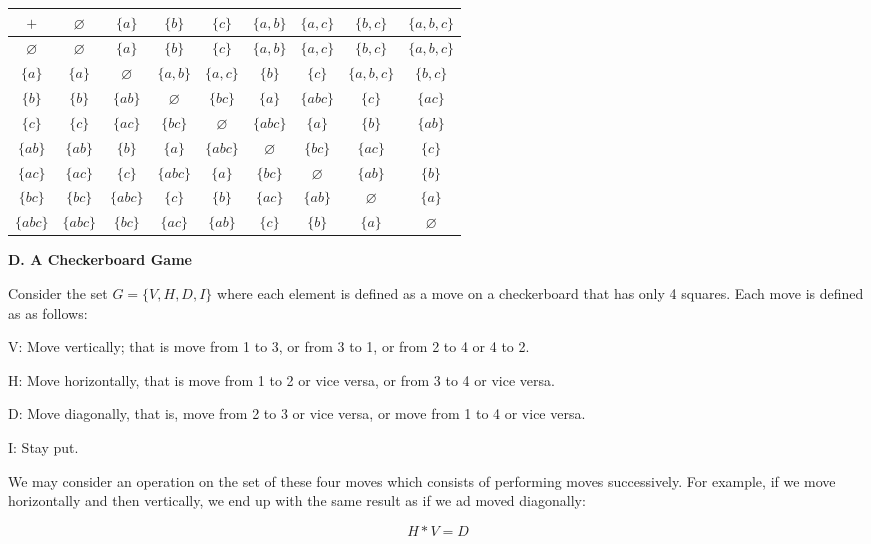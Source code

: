 \documentclass[12pt]{article}   %
\let\emptyset\varnothing
\begin{document}
\begin{tabular}{c | c c c c c c c c}
$+$ & $\emptyset$ & $\{a\}$ & $\{b\}$ & $\{c\}$ & $\{a,b\}$ & $\{a,c\}$ & $\{b,c\}$ & $\{a,b,c\}$ \\
\hline
$\emptyset$ & $\emptyset$ & $\{a\}$ & $\{b\}$ & $\{c\}$ & $\{a,b\}$ & $\{a,c\}$ & $\{b,c\}$ & $\{a,b,c\}$ \\
$\{a\}$ & $\{a\}$ & $\emptyset$ & $\{a,b\}$ & $\{a,c\}$ & $\{b\}$ & $\{c\}$ & $\{a,b,c\}$ & $\{b,c\}$ \\
$\{b\}$ & $\{b\}$ & $\{ab\}$ & $\emptyset$ & $\{bc\}$ & $\{a\}$ & $\{abc\}$ & $\{c\}$ & $\{ac\}$ \\
$\{c\}$ & $\{c\}$ & $\{ac\}$ & $\{bc\}$ & $\emptyset$ & $\{abc\}$ & $\{a\}$ & $\{b\}$ & $\{ab\}$ \\
$\{ab\}$ & $\{ab\}$ & $\{b\}$ & $\{a\}$ & $\{abc\}$ & $\emptyset$ & $\{bc\}$ & $\{ac\}$ & $\{c\}$ \\
$\{ac\}$ & $\{ac\}$ & $\{c\}$ & $\{abc\}$ & $\{a\}$ & $\{bc\}$ & $\emptyset$ & $\{ab\}$ & $\{b\}$ \\
$\{bc\}$ & $\{bc\}$ & $\{abc\}$ & $\{c\}$ & $\{b\}$ & $\{ac\}$ & $\{ab\}$ & $\emptyset$ & $\{a\}$ \\
$\{abc\}$ & $\{abc\}$ & $\{bc\}$ & $\{ac\}$ & $\{ab\}$ & $\{c\}$ & $\{b\}$ & $\{a\}$ & $\emptyset$
\end{tabular}


\bigskip

\noindent\textbf{D. A Checkerboard Game} \smallskip

Consider the set $G = \{V, H, D, I\}$ where each element is defined as a move on a checkerboard that has only 4 squares. Each move is defined as as follows:
\smallskip

V: Move vertically; that is move from 1 to 3, or from 3 to 1, or from 2 to 4 or 4 to 2.
\smallskip

H: Move horizontally, that is move from 1 to 2 or vice versa, or from 3 to 4 or vice versa.
\smallskip

D: Move diagonally, that is, move from 2 to 3 or vice versa, or move from 1 to 4 or vice versa.
\smallskip

I: Stay put.

We may consider an operation on the set of these four moves which consists of performing moves successively. For example, if we move horizontally and then vertically, we end up with the same result as if we ad moved diagonally:

\begin{equation*}
H * V = D
\end{equation*}
\end{document}
